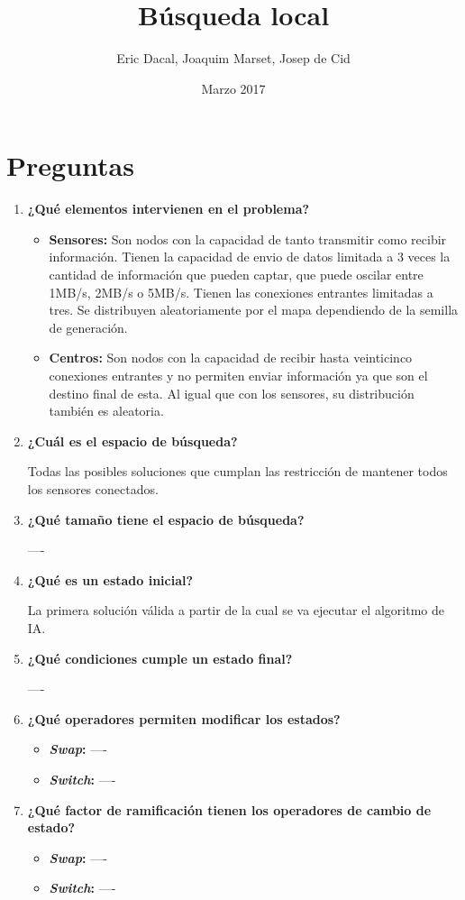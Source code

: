\documentclass{article}
\title{Búsqueda local}
\author{Eric Dacal, Joaquim Marset, Josep de Cid}
\date{Marzo 2017}
\begin{document}
\maketitle

\section{Preguntas}
\begin{enumerate}
  \item \textbf{¿Qué elementos intervienen en el problema?}
  \begin{itemize}
      \item \textbf{Sensores:} Son nodos con la capacidad de tanto transmitir como recibir información. Tienen la capacidad de envio de datos limitada a 3 veces la cantidad de información que pueden captar, que puede oscilar entre 1MB/s, 2MB/s o 5MB/s. Tienen las conexiones entrantes limitadas a tres. Se distribuyen aleatoriamente por el mapa dependiendo de la semilla de generación.
      \item \textbf{Centros:} Son nodos con la capacidad de recibir hasta veinticinco conexiones entrantes y no permiten enviar información ya que son el destino final de esta. Al igual que con los sensores, su distribución también es aleatoria.
  \end{itemize}
  \item \textbf{¿Cuál es el espacio de búsqueda?}\par
  Todas las posibles soluciones que cumplan las restricción de mantener todos los sensores conectados.
  \item \textbf{¿Qué tamaño tiene el espacio de búsqueda?}\par
  ----
  \item \textbf{¿Qué es un estado inicial?}\par
  La primera solución válida a partir de la cual se va ejecutar el algoritmo de IA.
  \item \textbf{¿Qué condiciones cumple un estado final?}\par
  ----
  \item \textbf{¿Qué operadores permiten modificar los estados?}
  \begin{itemize}
      \item \textbf{\textit{Swap}:} ----
      \item \textbf{\textit{Switch}:} ----
  \end{itemize}
  \item \textbf{¿Qué factor de ramificación tienen los operadores de cambio de estado?}
  \begin{itemize}
      \item \textbf{\textit{Swap}:} ----
      \item \textbf{\textit{Switch}:} ----
  \end{itemize}
\end{enumerate}
\end{document}
